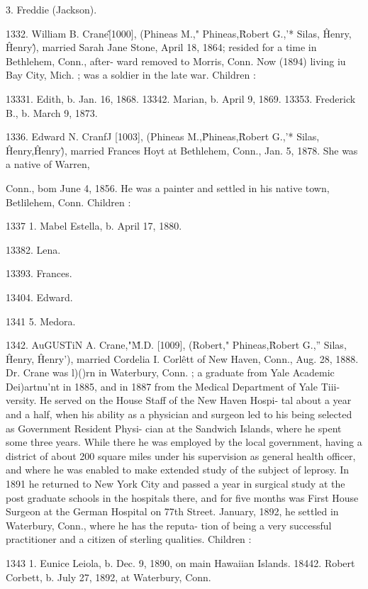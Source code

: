 3. Freddie (Jackson). 

1332. William B. Crane\^ [1000], (Phineas M.," Phineas,\^ 
Robert G.,'* Silas, \^ Henry, \^ Henry\^), married Sarah Jane Stone, 
April 18, 1864; resided for a time in Bethlehem, Conn., after- 
ward removed to Morris, Conn. Now (1894) living iu Bay City, 
Mich. ; was a soldier in the late war. Children : 

13331. Edith, b. Jan. 16, 1868. 
13342. Marian, b. April 9, 1869. 
13353. Frederick B., b. March 9, 1873. 

1336. Edward N. CranfJ [1003], (Phineas M.,\^ Phineas,\^ 
Robert G.,'* Silas, \^ Henry,\^ Henry\^), married Frances Hoyt at 
Bethlehem, Conn., Jan. 5, 1878. She was a native of Warren, 




Conn., bom June 4, 1856. He was a painter and settled in his 
native town, Betlilehem, Conn. Children : 

1337  1. Mabel Estella, b. April 17, 1880. 

13382. Lena. 

13393. Frances. 

13404. Edward. 

1341  5. Medora. 

1342. AuGUSTiN A. Crane,"\^ M.D. [1009], (Robert," Phineas,\^ 
Robert G.,'' Silas, \^ Henry, \^ Henry'), married Cordelia I. Corl\^ett 
of New Haven, Conn., Aug. 28, 1888. Dr. Crane was l)()rn in 
Waterbury, Conn. ; a graduate from Yale Academic Dei)artnu'nt 
in 1885, and in 1887 from the Medical Department of Yale Tiii- 
versity. He served on the House Staff of the New Haven Hospi- 
tal about a year and a half, when his ability as a physician and 
surgeon led to his being selected as Government Resident Physi- 
cian at the Sandwich Islands, where he spent some three years. 
While there he was employed by the local government, having a 
district of about 200 square miles under his supervision as general 
health officer, and where he was enabled to make extended study 
of the subject of leprosy. In 1891 he returned to New York 
City and passed a year in surgical study at the post graduate 
schools in the hospitals there, and for five months was First 
House Surgeon at the German Hospital on 77th Street. January, 
1892, he settled in Waterbury, Conn., where he has the reputa- 
tion of being a very successful practitioner and a citizen of 
sterling qualities. Children : 

1343  1. Eunice Leiola, b. Dec. 9, 1890, on main Hawaiian Islands. 
18442. Robert Corbett, b. July 27, 1892, at Waterbury, Conn. 

